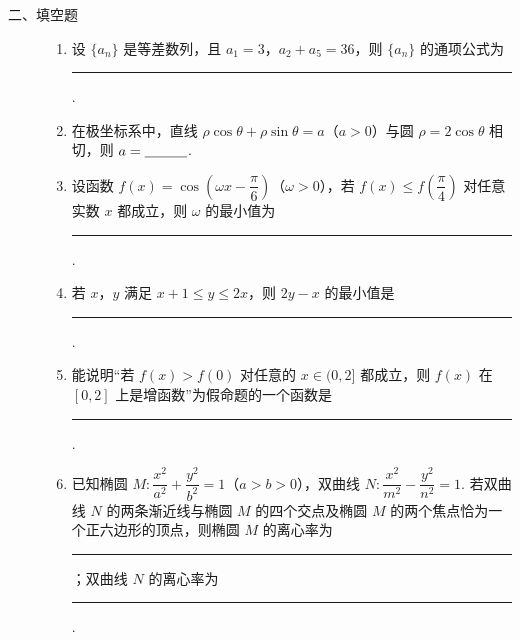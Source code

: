 \begin{description}

    \item[二、填空题]

    \begin{enumerate}[leftmargin=5pt]

      \addtocounter{enumi}{+8}

        \item 设 \(\{a_n\}\) 是等差数列，且 \(a_1=3\)，\(a_2+a_5=36\)，则 \(\{a_n\}\) 的通项公式为\rule[-0.3ex]{3em}{0.4pt}.

        \item 在极坐标系中，直线 \(\rho\cos\theta+\rho\sin\theta=a\)（\(a>0\)）与圆 \(\rho=2\cos\theta\) 相切，则 \(a=\rule[-0.3ex]{3em}{0.4pt}\).

        \item 设函数 \(f(x)=\cos\!\left(\omega x-\dfrac{\pi}{6}\right)\)（\(\omega>0\)），若 \(f(x)\le f\!\left(\dfrac{\pi}{4}\right)\) 对任意实数 \(x\) 都成立，则 \(\omega\) 的最小值为\rule[-0.3ex]{3em}{0.4pt}.

        \item 若 \(x\)，\(y\) 满足 \(x+1\le y\le 2x\)，则 \(2y-x\) 的最小值是\rule[-0.3ex]{3em}{0.4pt}.

        \item 能说明“若 \(f(x)>f(0)\) 对任意的 \(x\in(0,2]\) 都成立，则 \(f(x)\) 在 \([0,2]\) 上是增函数”为假命题的一个函数是\rule[-0.3ex]{3em}{0.4pt}.

        \item 已知椭圆 \(M:\dfrac{x^2}{a^2}+\dfrac{y^2}{b^2}=1\)（\(a>b>0\)），双曲线 \(N:\dfrac{x^2}{m^2}-\dfrac{y^2}{n^2}=1\). 若双曲线 \(N\) 的两条渐近线与椭圆 \(M\) 的四个交点及椭圆 \(M\) 的两个焦点恰为一个正六边形的顶点，则椭圆 \(M\) 的离心率为\rule[-0.3ex]{3em}{0.4pt}；双曲线 \(N\) 的离心率为\rule[-0.3ex]{3em}{0.4pt}.

    \end{enumerate}

\end{description}

